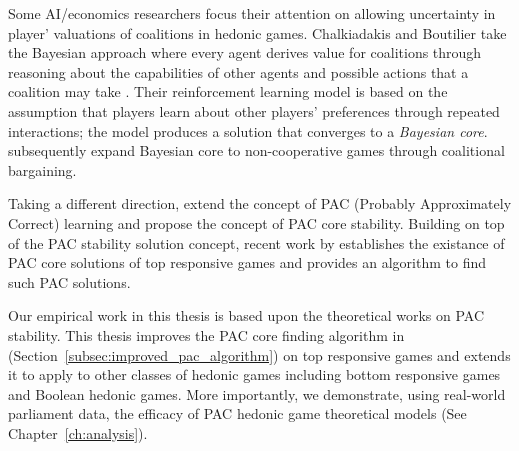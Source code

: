 Some AI/economics researchers focus their attention on allowing uncertainty in
player' valuations of coalitions in hedonic games.
Chalkiadakis and Boutilier take the Bayesian approach where every agent derives
value for coalitions through reasoning about the capabilities of other agents
and possible actions that a coalition may take
\cite{Chalkiadakis2004, Chalkiadakis:2008:SDM:1402383.1402435}.
Their reinforcement learning model is based on the assumption that players
learn about other players' preferences through repeated interactions; the model
produces a solution that converges to a \textit{Bayesian core}.
 subsequently expand Bayesian core to
non-cooperative games through coalitional bargaining.

Taking a different direction, 
extend the concept of PAC (Probably Approximately Correct) learning and
propose the concept of PAC core stability.
Building on top of the PAC stability solution concept, recent work by
 establishes the existance of PAC core solutions
of top responsive games and provides an algorithm to find such PAC solutions.


Our empirical work in this thesis is based upon the theoretical works on PAC
stability.
This thesis improves the PAC core finding algorithm in \cite{ijcai2017-380}
(Section~\ref{subsec:improved_pac_algorithm}) on top responsive games and
extends it to apply to other classes of hedonic games including bottom
responsive games and Boolean hedonic games.
More importantly, we demonstrate, using real-world parliament data, the
efficacy of PAC hedonic game theoretical models (See Chapter~\ref{ch:analysis}).
